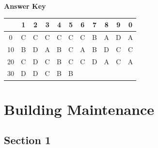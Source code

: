 \documentclass[11pt,a4paper]{article}
\begin{document}
\textbf{Answer Key}
\begin{tabular}{ | c | c c c c c c c c c c | }
\hline
 & 1 & 2 & 3 & 4 & 5 & 6 & 7 & 8 & 9 & 0 \\
\hline
0 & C & C & C & C & C & C & B & A & D & A \\
10 & B & D & A & B & C & A & B & D & C & C \\
20 & C & D & C & B & C & C & D & A & C & A \\
30 & D & D & C & B & B &   &   &   &   &   \\
\hline
\end{tabular}
\clearpage
\section{Building Maintenance}
\subsection*{Section 1}
\end{document}
